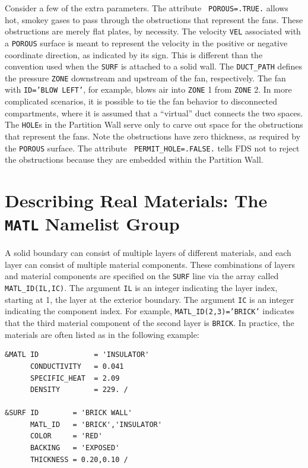 \documentclass[11pt]{book}
\newcommand{\ct}{\tt\small}
\begin{document}
\noindent
{}
Consider a few of the extra parameters. The attribute {\ct
POROUS=.TRUE.} allows hot, smokey gases to pass through the
obstructions that represent the fans. These obstructions are merely
flat plates, by necessity. The velocity {\ct VEL} associated with a
{\ct POROUS} surface is meant to represent the velocity in the
positive or negative coordinate direction, as indicated by its
sign. This is different than the convention used when the {\ct SURF}
is attached to a solid wall. The {\ct DUCT\_PATH} defines the pressure
{\ct ZONE} downstream and upstream of the fan, respectively. The fan
with {\ct ID='BLOW LEFT'}, for example, blows air into {\ct ZONE} 1
from {\ct ZONE} 2.  In more complicated scenarios, it is possible to
tie the fan behavior to disconnected compartments, where it is assumed
that a ``virtual'' duct connects the two spaces. The {\ct HOLE}s in
the Partition Wall serve only to carve out space for the obstructions
that represent the fans. Note the obstructions have zero thickness, as
required by the {\ct POROUS} surface. The attribute {\ct
PERMIT\_HOLE=.FALSE.} tells FDS not to reject the obstructions because
they are embedded within the Partition Wall.










\clearpage


\section{Describing Real Materials: The \texorpdfstring{{\tt MATL}}{MATL} Namelist Group}
\label{info:MATL}

A solid boundary can consist of multiple layers of different
materials, and each layer can consist of multiple material
components. These combinations of layers and material components are
specified on the {\ct SURF} line via the array called {\ct
MATL\_ID(IL,IC)}. The argument {\ct IL} is an integer indicating the
layer index, starting at 1, the layer at the exterior boundary. The
argument {\ct IC} is an integer indicating the component index. For
example, {\ct MATL\_ID(2,3)='BRICK'} indicates that the third material
component of the second layer is {\ct BRICK}. In practice, the
materials are often listed as in the following example:

\footnotesize
\begin{verbatim}
&MATL ID             = 'INSULATOR'
      CONDUCTIVITY   = 0.041
      SPECIFIC_HEAT  = 2.09
      DENSITY        = 229. /

&SURF ID        = 'BRICK WALL'
      MATL_ID   = 'BRICK','INSULATOR'
      COLOR     = 'RED'
      BACKING   = 'EXPOSED'
      THICKNESS = 0.20,0.10 /

\end{verbatim}
\normalsize
\end{document}
